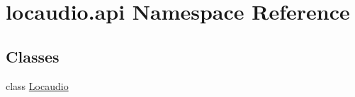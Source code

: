 \hypertarget{namespacelocaudio_1_1api}{\section{locaudio.\-api Namespace Reference}
\label{namespacelocaudio_1_1api}
}
\subsection*{Classes}
\begin{DoxyCompactItemize}
\item 
class \hyperlink{classlocaudio_1_1api_1_1Locaudio}{Locaudio}
\end{DoxyCompactItemize}
